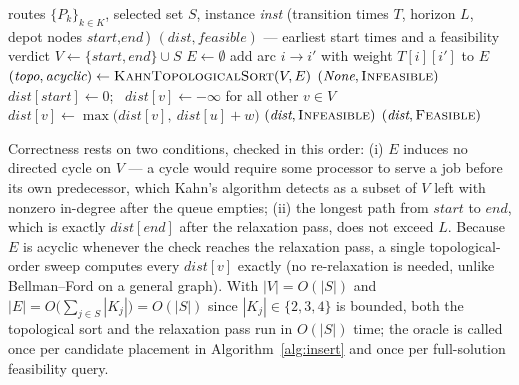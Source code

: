 \documentclass[11pt]{article}
\begin{document}
\begin{algorithm}[t]
\caption{Synchronisation feasibility oracle (\textsc{LongestPathScheduleCheck})}
\label{alg:oracle}
\begin{algorithmic}[1]
\Require routes $\{P_k\}_{k\in K}$, selected set $S$, instance \textit{inst} (transition times $T$, horizon $L$, depot nodes $\textit{start}, \textit{end}$)
\Ensure $(\textit{dist}, \textit{feasible})$ --- earliest start times and a feasibility verdict
\State $V \gets \{\textit{start}, \textit{end}\} \cup S$ 
\State $E \gets \emptyset$
         
            \State add arc $i \to i'$ with weight $T[i][i']$ to $E$
        \EndIf
    \EndFor
\EndFor
\State $(\textit{topo}, \textit{acyclic}) \gets \textsc{KahnTopologicalSort}(V, E)$ 
    \State \Return $(\textit{None}, \textsc{Infeasible})$ 
\EndIf
\State $\textit{dist}[\textit{start}] \gets 0$; \ $\textit{dist}[v] \gets -\infty$ for all other $v \in V$
 
        \State $\textit{dist}[v] \gets \max\bigl(\textit{dist}[v],\ \textit{dist}[u] + w\bigr)$ 
    \EndFor
\EndFor
{}
    \State \Return $(\textit{dist}, \textsc{Infeasible})$ 
\Else
    \State \Return $(\textit{dist}, \textsc{Feasible})$
\EndIf
\end{algorithmic}
\end{algorithm}

Correctness rests on two conditions, checked in this order: (i) $E$ induces no directed cycle on $V$ --- a cycle would require some processor to serve a job before its own predecessor, which Kahn's algorithm detects as a subset of $V$ left with nonzero in-degree after the queue empties; (ii) the longest path from $\textit{start}$ to $\textit{end}$, which is exactly $\textit{dist}[\textit{end}]$ after the relaxation pass, does not exceed $L$. Because $E$ is acyclic whenever the check reaches the relaxation pass, a single topological-order sweep computes every $\textit{dist}[v]$ exactly (no re-relaxation is needed, unlike Bellman--Ford on a general graph). With $|V| = O(|S|)$ and $|E| = O\bigl(\sum_{j\in S}|K_j|\bigr) = O(|S|)$ since $|K_j|\in\{2,3,4\}$ is bounded, both the topological sort and the relaxation pass run in $O(|S|)$ time; the oracle is called once per candidate placement in Algorithm~\ref{alg:insert} and once per full-solution feasibility query.
\end{document}

